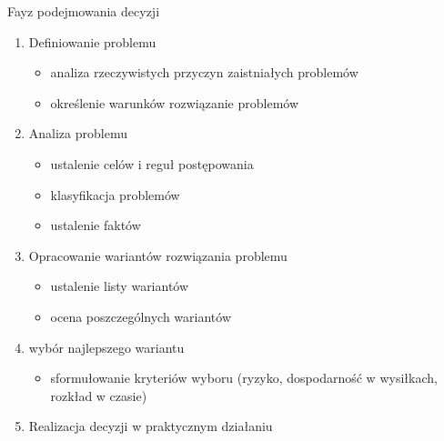 \documentclass[a4paper,10pt]{report}
\begin{document}
\noindent Fayz podejmowania decyzji
\begin{enumerate}
	\item Definiowanie problemu
	\begin{itemize}
		\item analiza rzeczywistych przyczyn zaistniałych problemów
		\item określenie warunków rozwiązanie problemów
	\end{itemize}
	\item Analiza problemu
	\begin{itemize}
		\item ustalenie celów i reguł postępowania
		\item klasyfikacja problemów
		\item ustalenie faktów
	\end{itemize}
	\item Opracowanie wariantów rozwiązania problemu
	\begin{itemize}
		\item ustalenie listy wariantów
		\item ocena poszczególnych wariantów
	\end{itemize}
	\item wybór najlepszego wariantu
	\begin{itemize}
		\item sformułowanie kryteriów wyboru (ryzyko, dospodarność w wysiłkach, rozkład w czasie)
	\end{itemize}
	\item Realizacja decyzji w praktycznym działaniu
\end{enumerate}
\end{document}
